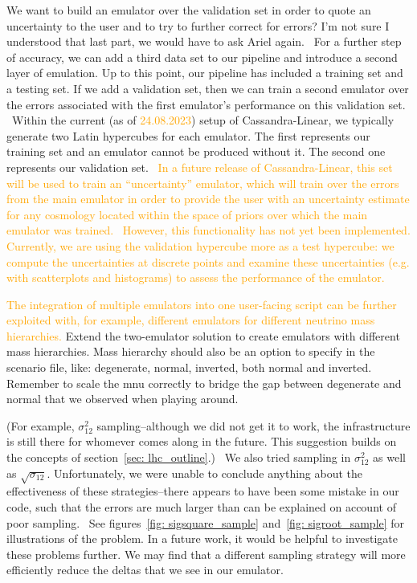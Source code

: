We want to build an emulator over the validation set in order to quote an 
uncertainty to the user and to try to further correct for errors? I'm not sure 
I understood that last part, we would have to ask Ariel again.
\
For a further step of accuracy, we can add a third data set to our pipeline
and introduce a second layer of emulation. Up to this point, our pipeline has 
included a training set and a testing set.
If we add a validation set, then we can train a second emulator over the
errors associated with the first emulator's performance on this validation
set.
\
Within the current (as of \textcolor{orange}{24.08.2023}) setup of
Cassandra-Linear, we typically generate two Latin hypercubes for each
emulator. The first represents our training set and an emulator cannot be
produced without it. The second one represents our validation set.
\
\textcolor{orange}{In a future
release of Cassandra-Linear, this set will be used to train an ``uncertainty''
emulator, which will train over the errors from the main emulator in order to
provide the user with an uncertainty estimate for any cosmology located within
the space of priors over which the main emulator was trained.} 
\
\textcolor{orange}{However, this functionality has not yet been implemented. 
Currently, we are 
using the validation hypercube more as a test hypercube: we compute the 
uncertainties at discrete points and examine these uncertainties (e.g. with
scatterplots and histograms) to assess the performance of the emulator.}

\textcolor{orange}{The integration of 
multiple emulators into one user-facing script can be further exploited with, 
for example, different emulators for different neutrino mass hierarchies.}
Extend the two-emulator solution to create emulators with different mass
hierarchies. Mass hierarchy should also be an option to specify in the
scenario file, like: degenerate, normal, inverted, both normal and inverted. 
Remember to scale the mnu correctly to bridge the gap between degenerate and
normal that we observed when playing around.

(For example, $\sigma_{12}^2$ sampling--although we did not
get it to work, the infrastructure is still there for whomever comes along in
the future. This suggestion builds on the concepts of
section~\ref{sec: lhc_outline}.)
\
We also tried sampling in $\sigma_{12}^2$ as well as $\sqrt{\sigma_{12}}$.
Unfortunately, we were unable to conclude anything about the effectiveness of
these strategies--there appears to have been some mistake in our code, such
that the errors are much larger than can be explained on account of poor
sampling.
\
See figures~\ref{fig: sigsquare_sample} and~\ref{fig: sigroot_sample} for
illustrations of the problem. In a future work, it would be helpful to
investigate these problems further. We may find that a different sampling
strategy will more efficiently reduce the deltas that we see in our emulator.

